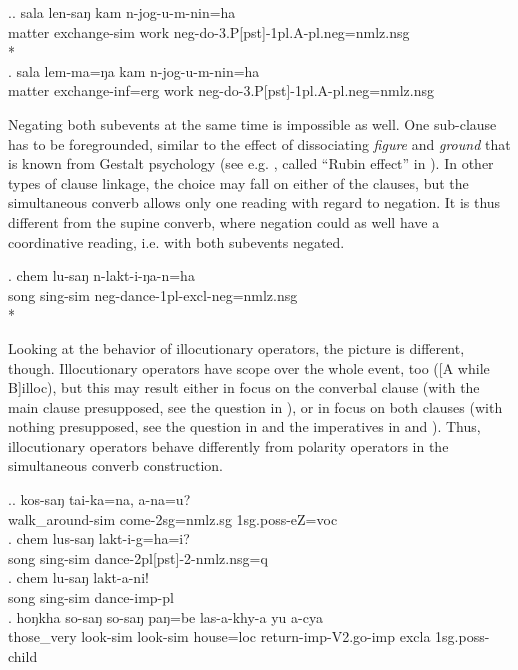\ex.\ag.	sala len-saŋ kam n-jog-u-m-nin=ha\\
			matter exchange-{\sc sim} work {\sc neg-}do{\sc -3.P[pst]-1pl.A-pl.neg=nmlz.nsg}\\
			*\\
	\bg.	sala lem-ma=ŋa kam n-jog-u-m-nin=ha\\
			matter exchange{\sc -inf=erg} work {\sc neg-}do{\sc -3.P[pst]-1pl.A-pl.neg=nmlz.nsg}\\
		
Negating both subevents at the same time is impossible as well. One sub-clause has to be foregrounded, similar to the effect of dissociating \emph{figure} and \emph{ground} that is known from Gestalt psychology (see e.g. \citet{Jackendoff1983Semantics}, called “Rubin effect” in \citet[48]{Bickel1991Typologische}). In other types of clause linkage, the choice may fall on either of the clauses, but the simultaneous converb allows only one reading with regard to negation. It is thus different from the supine converb, where negation could as well have a coordinative reading, i.e. with both subevents negated.

\exg.	chem lu-saŋ n-lakt-i-ŋa-n=ha\\
		song sing-{\sc sim} {\sc neg-}dance{\sc -1pl-excl-neg=nmlz.nsg}\\
		*\\
		
		
Looking at the behavior of illocutionary operators, the picture is different, though. Illocutionary operators have scope over the whole event, too ([A while B]{\sc illoc}), but this may result either in focus on the converbal clause (with the main clause presupposed, see the question in \Next[a]), or in focus on both clauses (with nothing presupposed, see the question in \Next[b] and the imperatives in \Next[c] and \Next[d]). Thus, illocutionary operators behave differently from polarity operators in the simultaneous converb construction. 

\ex.\ag.	kos-saŋ tai-ka=na, a-na=u?\\
		walk\_around{\sc -sim} come{\sc [npst]-2sg=nmlz.sg} {\sc 1sg.poss-}eZ={\sc voc}\\
		  
\bg.	chem lus-saŋ lakt-i-g=ha=i?\\
		song   sing-{\sc sim} dance{\sc -2pl[pst]-2-nmlz.nsg=q}\\
\bg.	chem lu-saŋ lakt-a-ni!\\
		song   sing-{\sc sim} dance{\sc -imp-pl}\\
\bg. hoŋkha so-saŋ   so-saŋ   paŋ=be   las-a-khy-a     yu    a-cya\\
 those\_very look{\sc -sim} look{\sc -sim} house{\sc =loc} return{\sc -imp-V2.go-imp}  {\sc excla}   {\sc 1sg.poss-}child\\
  

